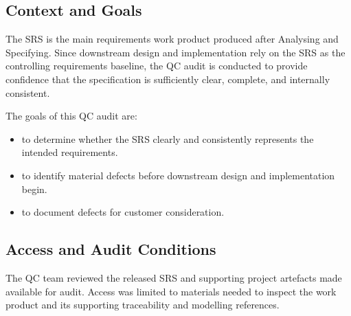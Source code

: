 \documentclass[11pt,a4paper]{article}
\begin{document}
\subsection{Context and Goals}
The SRS is the main requirements work product produced after Analysing and Specifying. Since downstream design and implementation rely on the SRS as the controlling requirements baseline, the QC audit is conducted to provide confidence that the specification is sufficiently clear, complete, and internally consistent.

The goals of this QC audit are:
\begin{itemize}[leftmargin=*]
\item to determine whether the SRS clearly and consistently represents the intended requirements.
\item to identify material defects before downstream design and implementation begin.
\item to document defects for customer consideration.
\end{itemize}

\subsection{Access and Audit Conditions}
The QC team reviewed the released SRS and supporting project artefacts made available for audit. Access was limited to materials needed to inspect the work product and its supporting traceability and modelling references.
\end{document}
